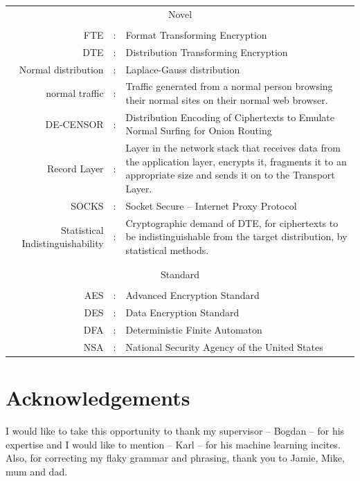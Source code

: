 \documentclass[ %
                    author={Samuel Russell},
                supervisor={Prof. Bogdan Warinschi},
                    degree={MEng},
                     title={Innocuous Ciphertexts},
                  subtitle={The DE-CENSOR Scheme},
                      type={Research},
                      year={2018} ]{dissertation}
\begin{document}
\begin{tabularx}{\textwidth}{ r c X }

\multicolumn{3}{c}{Novel}\\
&&\\
FTE					&:		& Format Transforming Encryption\\
DTE					&:		& Distribution Transforming Encryption\\
Normal distribution &:		& Laplace-Gauss distribution\\
normal traffic		&:		& Traffic generated from a normal person browsing their normal sites on their normal web browser.\\
DE-CENSOR			&:		& Distribution Encoding of Ciphertexts to Emulate Normal Surfing for Onion Routing\\
Record Layer		&:		& Layer in the network stack that receives data from the application layer, encrypts it, fragments it to an appropriate size and sends it on to the Transport Layer.\\
SOCKS				&:		& Socket Secure -- Internet Proxy Protocol\\
Statistical Indistinguishability&:& Cryptographic demand of DTE, for ciphertexts to be indistinguishable from the target distribution, by statistical methods.\\
&&\\
&&\\
\multicolumn{3}{c}{Standard}\\
&&\\
AES                 &:		& Advanced Encryption Standard\\
DES                 &:		& Data Encryption Standard\\
DFA					&:		& Deterministic Finite Automaton\\
NSA					&:		& National Security Agency of the United States\\
\end{tabularx}


\chapter*{Acknowledgements}


I would like to take this opportunity to thank my supervisor -- Bogdan -- for his expertise and I would like to mention -- Karl -- for his machine learning incites. Also, for correcting my flaky grammar and phrasing, thank you to Jamie, Mike, mum and dad.
\end{document}
